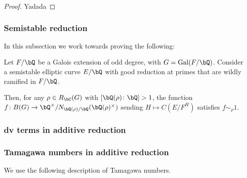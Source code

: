 \begin{proof}
    Yadada
\end{proof}

\subsubsection{Semistable reduction}

In this subsection we work towards proving the following:

\begin{thm}
    Let $F / \bQ$ be a Galois extension of odd degree, with $G = \Gal(F / \bQ)$. 
    Consider a semistable elliptic curve $E / \bQ$ with good reduction at primes that are wildly ramified in $F / \bQ$.
    
    Then, for any $\rho \in R_{\bC}(G)$ with $[\bQ(\rho)\colon \bQ] > 1$, the function $f \colon B(G) \to
    \bQ^{\times} / N_{\bQ(\rho) / \bQ}(\bQ(\rho)^{\times})$ sending $H \mapsto C(E / F^{H})$ satisfies $f \sim_{\rho} 1$.
\end{thm}

\subsubsection{dv terms in additive reduction}


\subsubsection{Tamagawa numbers in additive reduction}

We use the following description of Tamagawa numbers. %

